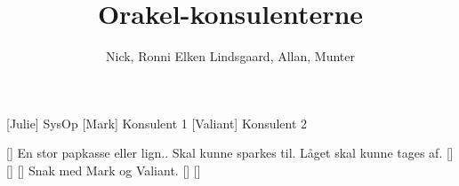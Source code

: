 \documentclass[a4paper,11pt]{article}
\title{Orakel-konsulenterne}
\author{Nick, Ronni Elken Lindsgaard, Allan, Munter}
\begin{document}
\maketitle

\begin{roles}
[Julie] SysOp
[Mark] Konsulent 1
[Valiant] Konsulent 2
\end{roles}

\begin{props}
[] En stor papkasse eller lign.. Skal kunne sparkes til. Låget skal kunne tages af.
[]
[]
[] Snak med Mark og Valiant.
[]
[]

\end{props}
\end{document}
